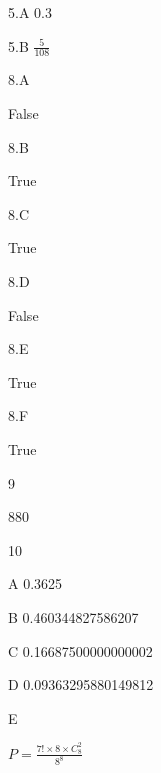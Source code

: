 \documentclass{article}
\begin{document}
5.A
0.3

\hspace*{\fill}

5.B
$\frac{5}{108}$

\hspace*{\fill}

8.A

False

\hspace*{\fill}

8.B

True

\hspace*{\fill}

8.C

True

\hspace*{\fill}

8.D

False

\hspace*{\fill}

8.E

True

\hspace*{\fill}

8.F

True

\hspace*{\fill}

9

880

\hspace*{\fill}

10

A 0.3625

B 0.460344827586207

C 0.16687500000000002

D 0.09363295880149812

E 

$P= \frac{7!\times 8\times C_8^2}{8^8}$ 




	
\end{document}
